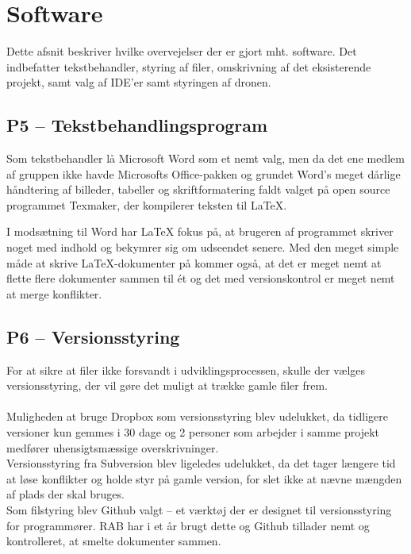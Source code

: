 \documentclass[Main]{subfiles}
\begin{document}
\chapter{Software}
Dette afsnit beskriver hvilke overvejelser der er gjort mht. software.
Det indbefatter tekstbehandler, styring af filer, omskrivning af det eksisterende projekt, samt valg af IDE'er samt styringen af dronen.


\section[Tekstbehandlingsprogram]{P5 -- Tekstbehandlingsprogram}

Som tekstbehandler lå Microsoft Word som et nemt valg, men da det ene medlem af gruppen ikke havde Microsofts Office-pakken og grundet Word's meget dårlige håndtering af billeder, tabeller og skriftformatering faldt valget på open source programmet Texmaker\cite{Texmaker}, der kompilerer teksten til LaTeX.

I modsætning til Word har LaTeX fokus på, at brugeren af programmet skriver noget med indhold og bekymrer sig om udseendet senere. 
Med den meget simple måde at skrive LaTeX-dokumenter på kommer også, at det er meget nemt at flette flere dokumenter sammen til ét og det med versionskontrol er meget nemt at merge konflikter.



\section[Versionsstyring]{P6 -- Versionsstyring}
For at sikre at filer ikke forsvandt i udviklingsprocessen, skulle der vælges  versionsstyring, der vil gøre det muligt at trække gamle filer frem.
\\
\\
Muligheden at bruge Dropbox som versionsstyring blev udelukket, da tidligere versioner kun gemmes i 30 dage\cite{Dropbox} og 2 personer som arbejder i samme projekt medfører uhensigtsmæssige overskrivninger.
\\
Versionsstyring fra Subversion\cite{Subversion} blev ligeledes udelukket, da det tager længere tid at løse konflikter og holde styr på gamle version, for slet ikke at nævne mængden af plads der skal bruges.
\\
Som filstyring blev Github\cite{Github-IHA} valgt -- et værktøj der er designet til versionsstyring for programmører. 
RAB har i et år brugt dette og Github tillader nemt og kontrolleret, at smelte dokumenter sammen.
\end{document}
